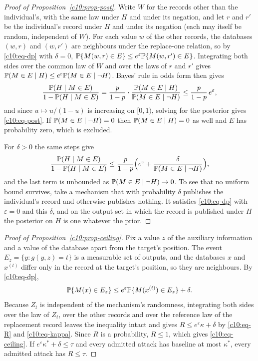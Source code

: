 \begin{proof}[Proof of Proposition~\ref{c10:prop-post}]
Write $W$ for the records other than the individual's, with the same law under
$H$ and under its negation, and let $r$ and $r'$ be the individual's record under
$H$ and under its negation (each may itself be random, independent of $W$). For
each value $w$ of the other records, the databases $(w, r)$ and $(w, r')$ are
neighbours under the replace-one relation, so by \eqref{c10:eq-dp} with
$\delta = 0$, $\mathbb{P}\{M(w,r) \in E\} \le e^\varepsilon \mathbb{P}\{M(w,r') \in E\}$.
Integrating both sides over the common law of $W$ and over the laws of $r$ and
$r'$ gives
$\mathbb{P}(M \in E \mid H) \le e^\varepsilon \mathbb{P}(M \in E \mid \neg H)$. Bayes' rule
in odds form then gives
\[
\frac{\mathbb{P}(H \mid M \in E)}{1 - \mathbb{P}(H \mid M \in E)}
= \frac{p}{1-p}\cdot\frac{\mathbb{P}(M \in E \mid H)}{\mathbb{P}(M \in E \mid \neg H)}
\le \frac{p}{1-p}\,e^{\varepsilon},
\]
and since $u \mapsto u/(1-u)$ is increasing on $[0,1)$, solving for the posterior
gives \eqref{c10:eq-post}. If $\mathbb{P}(M \in E \mid \neg H) = 0$ then
$\mathbb{P}(M \in E \mid H) = 0$ as well and $E$ has probability zero, which is
excluded.

For $\delta > 0$ the same steps give
\[
\frac{\mathbb{P}(H \mid M \in E)}{1 - \mathbb{P}(H \mid M \in E)}
\le \frac{p}{1-p}\Bigl(e^{\varepsilon} + \frac{\delta}{\mathbb{P}(M \in E \mid \neg H)}\Bigr),
\]
and the last term is unbounded as $\mathbb{P}(M \in E \mid \neg H) \to 0$. To see that
no uniform bound survives, take a mechanism that with probability $\delta$
publishes the individual's record and otherwise publishes nothing. It satisfies
\eqref{c10:eq-dp} with $\varepsilon = 0$ and this $\delta$, and on the output set
in which the record is published under $H$ the posterior on $H$ is one whatever the
prior.
\end{proof}

\begin{proof}[Proof of Proposition~\ref{c10:prop-ceiling}]
Fix a value $z$ of the auxiliary information and a value of the database apart from
the target's position. The event $E_z = \{y : g(y, z) = t\}$ is a measurable set
of outputs, and the databases $x$ and $x^{(t)}$ differ only in the record at the
target's position, so they are neighbours. By \eqref{c10:eq-dp},
\[
\mathbb{P}\{M(x) \in E_z\} \le e^{\varepsilon}\mathbb{P}\{M(x^{(t)}) \in E_z\} + \delta .
\]
Because $Z_t$ is independent of the mechanism's randomness, integrating both sides
over the law of $Z_t$, over the other records and over the reference law of the
replacement record leaves the inequality intact and gives
$R \le e^{\varepsilon}\kappa + \delta$ by \eqref{c10:eq-R} and
\eqref{c10:eq-kappa}. Since $R$ is a probability, $R \le 1$, which gives
\eqref{c10:eq-ceiling}. If $e^{\varepsilon}\kappa^\ast + \delta \le \tau$ and every
admitted attack has baseline at most $\kappa^\ast$, every admitted attack has
$R \le \tau$.
\end{proof}

